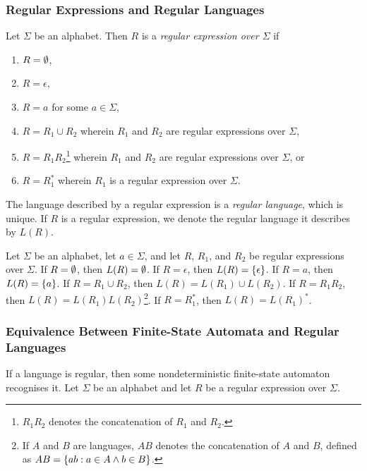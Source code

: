\subsubsection{Regular Expressions and Regular Languages}

\Bdf
    Let \(\Sigma\) be an alphabet. Then \(R\) is a \emph{regular expression over
    \(\Sigma\)} if
    \begin{enumerate}
        \item \(R = \emptyset\),
        \item \(R = \epsilon\),
        \item \(R = a\) for some \(a \in \Sigma\),
        \item \(R = R_1 \cup R_2\) wherein \(R_1\) and \(R_2\) are regular
        expressions over \(\Sigma\),
        \item \(R = R_1 R_2\)\footnote{\(R_1 R_2\) denotes the concatenation of
        \(R_1\) and \(R_2\).} wherein \(R_1\) and \(R_2\) are regular
        expressions over \(\Sigma\), or
        \item \(R = R_1^*\) wherein \(R_1\) is a regular expression over
        \(\Sigma\).
    \end{enumerate}
\Edf

The language described by a regular expression is a \emph{regular language},
which is unique. If \(R\) is a regular expression, we denote the regular
language it describes by \(L(R)\).

Let \(\Sigma\) be an alphabet, let \(a \in \Sigma\), and let \(R\), \(R_1\), and
\(R_2\) be regular expressions over \(\Sigma\). If \(R = \emptyset\), then \(L(R) =
\emptyset\). If \(R = \epsilon\), then \(L(R) = \{\epsilon\}\). If \(R = a\), then
\(L(R) = \{a\}\). If \(R = R_1 \cup R_2\), then \(L(R) = L(R_1) \cup L(R_2)\).
If \(R = R_1 R_2\), then \(L(R) = L(R_1) L(R_2)\)\footnote{If \(A\) and \(B\)
are languages, \(A B\) denotes the concatenation of \(A\) and \(B\), defined
as \(A B = \{a b : a \in A \land b \in B\}\).}. If \(R = R_1^*\), then \(L(R) =
L(R_1)^*\).

\subsubsection{Equivalence Between Finite-State Automata and Regular Languages}

\Blm
    \label{lem1}
    If a language is regular, then some nondeterministic finite-state automaton
    recognises it.
\Elm
\Bpr
    Let \(\Sigma\) be an alphabet and let \(R\) be a regular expression over
    \(\Sigma\).

